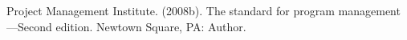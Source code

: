 \documentclass[
12pt,		%
openright,	%
twoside,  %
a4paper,			%
chapter=TITLE,		%
english,			%
french,				%
spanish,			%
brazil				%
]{USPSC-classe/USPSC}
\begin{document}
\begin{flushleft}
\begin{flushleft}
\begin{flushleft}
\begin{flushleft}
\begin{flushleft}
\begin{flushleft}
\begin{flushleft}
\begin{flushleft}
\begin{flushleft}
\begin{flushleft}
[PMI, 2008] Project Management Institute. (2008b). The standard for program management—Second edition. Newtown Square, PA: Author.
\end{flushleft}


\end{flushleft}


\end{flushleft}


\end{flushleft}


\end{flushleft}


\end{flushleft}


\end{flushleft}


\end{flushleft}


\end{flushleft}


\end{flushleft}
\end{document}
